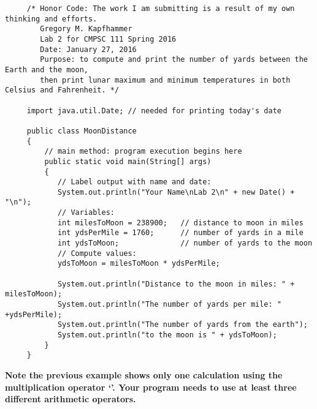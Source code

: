  \vspace*{-.15in}

\begin{verbatim}
     /* Honor Code: The work I am submitting is a result of my own thinking and efforts.
        Gregory M. Kapfhammer
        Lab 2 for CMPSC 111 Spring 2016
        Date: January 27, 2016
        Purpose: to compute and print the number of yards between the Earth and the moon,
        then print lunar maximum and minimum temperatures in both Celsius and Fahrenheit. */

     import java.util.Date; // needed for printing today's date

     public class MoonDistance
     {
         // main method: program execution begins here
         public static void main(String[] args)
         {
            // Label output with name and date:
            System.out.println("Your Name\nLab 2\n" + new Date() + "\n");
            // Variables:
            int milesToMoon = 238900;   // distance to moon in miles
            int ydsPerMile = 1760;      // number of yards in a mile
            int ydsToMoon;              // number of yards to the moon
            // Compute values:
            ydsToMoon = milesToMoon * ydsPerMile;

            System.out.println("Distance to the moon in miles: " + milesToMoon);
            System.out.println("The number of yards per mile: " +ydsPerMile);
            System.out.println("The number of yards from the earth");
            System.out.println("to the moon is " + ydsToMoon);
         }
     }
\end{verbatim}

\noindent \textbf{Note the previous example shows only one calculation using the multiplication operator `{\tt *}'. Your program
needs to use at least three different arithmetic operators. }

\vspace*{-.2in}
